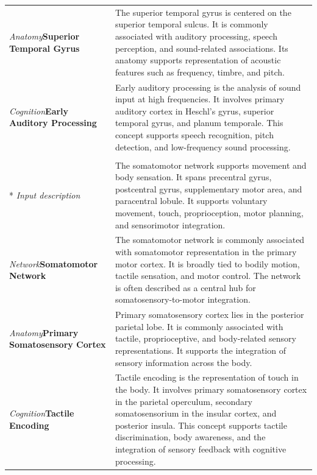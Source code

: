 {\begin{longtable}{@{}>{\raggedright\arraybackslash\hspace{0pt}}p{1.05in}>{\raggedright\arraybackslash\hspace{0pt}}p{3.98in}@{}}
\textit{Anatomy}\newline\hspace{0pt}\textbf{Superior Temporal Gyrus} & The superior temporal gyrus is centered on the superior temporal sulcus. It is commonly associated with auditory processing, speech perception, and sound-related associations. Its anatomy supports representation of acoustic features such as frequency, timbre, and pitch. \\[3pt]
\textit{Cognition}\newline\hspace{0pt}\textbf{Early Auditory Processing} & Early auditory processing is the analysis of sound input at high frequencies. It involves primary auditory cortex in Heschl's gyrus, superior temporal gyrus, and planum temporale. This concept supports speech recognition, pitch detection, and low-frequency sound processing. \\
\midrule
\multicolumn{2}{@{}l}{\textbf{Somatomotor} (WashU LateralSM)} \\*
\textit{Input description} & The somatomotor network supports movement and body sensation. It spans precentral gyrus, postcentral gyrus, supplementary motor area, and paracentral lobule. It supports voluntary movement, touch, proprioception, motor planning, and sensorimotor integration. \\[3pt]
\textit{Network}\newline\hspace{0pt}\textbf{Somatomotor Network} & The somatomotor network is commonly associated with somatomotor representation in the primary motor cortex. It is broadly tied to bodily motion, tactile sensation, and motor control. The network is often described as a central hub for somatosensory-to-motor integration. \\[3pt]
\textit{Anatomy}\newline\hspace{0pt}\textbf{Primary Somatosensory Cortex} & Primary somatosensory cortex lies in the posterior parietal lobe. It is commonly associated with tactile, proprioceptive, and body-related sensory representations. It supports the integration of sensory information across the body. \\[3pt]
\textit{Cognition}\newline\hspace{0pt}\textbf{Tactile Encoding} & Tactile encoding is the representation of touch in the body. It involves primary somatosensory cortex in the parietal operculum, secondary somatosensorium in the insular cortex, and posterior insula. This concept supports tactile discrimination, body awareness, and the integration of sensory feedback with cognitive processing. \\

\end{longtable}}
